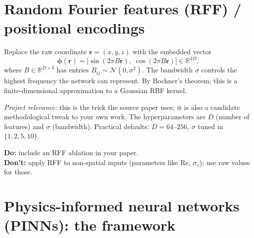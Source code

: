 \documentclass[11pt]{article}
\begin{document}
\section{Random Fourier features (RFF) / positional encodings}

Replace the raw coordinate $\mathbf{r} = (x,y,z)$ with the embedded vector
\[
\boldsymbol{\phi}(\mathbf{r}) = \big[\sin(2\pi B\mathbf{r}),\;\cos(2\pi B\mathbf{r})\big] \in \mathbb{R}^{2D},
\]
where $B \in \mathbb{R}^{D\times 3}$ has entries $B_{ij}\sim \mathcal{N}(0,\sigma^2)$. The bandwidth $\sigma$ controls the highest frequency the network can represent. By Bochner's theorem, this is a finite-dimensional approximation to a Gaussian RBF kernel.

\textit{Project relevance:} this is the trick the source paper uses; it is also a candidate methodological tweak to your own work. The hyperparameters are $D$ (number of features) and $\sigma$ (bandwidth). Practical defaults: $D = 64$--$256$, $\sigma$ tuned in $\{1, 2, 5, 10\}$.

\textbf{Do:} include an RFF ablation in your paper.\\
\textbf{Don't:} apply RFF to non-spatial inputs (parameters like Re, $\sigma_v$); use raw values for those.

\section{Physics-informed neural networks (PINNs): the framework}
\end{document}
